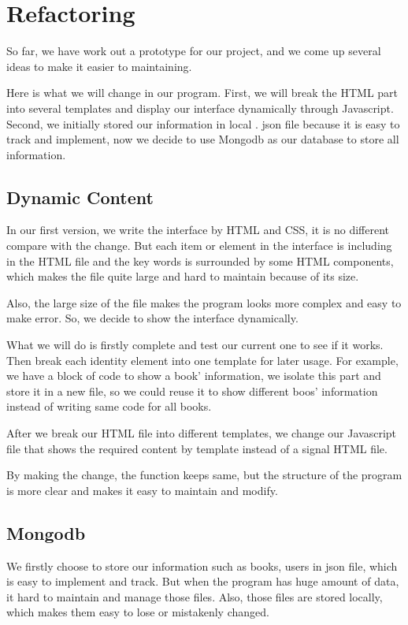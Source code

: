 \documentclass[12pt]{article}
\begin{document}
	\section{Refactoring}
		So far, we have work out a prototype for our project, and we come up several ideas to make it easier to maintaining.

	Here is what we will change in our program. First, we will break the HTML part into several templates and display our interface dynamically through Javascript. Second, we initially stored our information in local . json file because it is easy to track and implement, now we decide to use Mongodb as our database to store all information.


	\subsection{Dynamic Content}
	In our first version, we write the interface by HTML and CSS, it is no different compare with the change. But each item or element in the interface is including in the HTML file and the key words is surrounded by some HTML components, which makes the file quite large and hard to maintain because of its size.

	Also, the large size of the file makes the program looks more complex and easy to make error. So, we decide to show the interface dynamically.

	What we will do is firstly complete and test our current one to see if it works. Then break each identity element into one template for later usage. For example, we have a block of code to show a book’ information, we isolate this part and store it in a new file, so we could reuse it to show different boos’ information instead of writing same code for all books.

	After we break our HTML file into different templates, we change our Javascript file that shows the required content by template instead of a signal HTML file.

	By making the change, the function keeps same, but the structure of the program is more clear and makes it easy to maintain and modify.


	\subsection{Mongodb}
	 We firstly choose to store our information such as books, users in json file, which is easy to implement and track. But when the program has huge amount of data, it hard to maintain and manage those files. Also, those files are stored locally, which makes them easy to lose or mistakenly changed.
\end{document}

